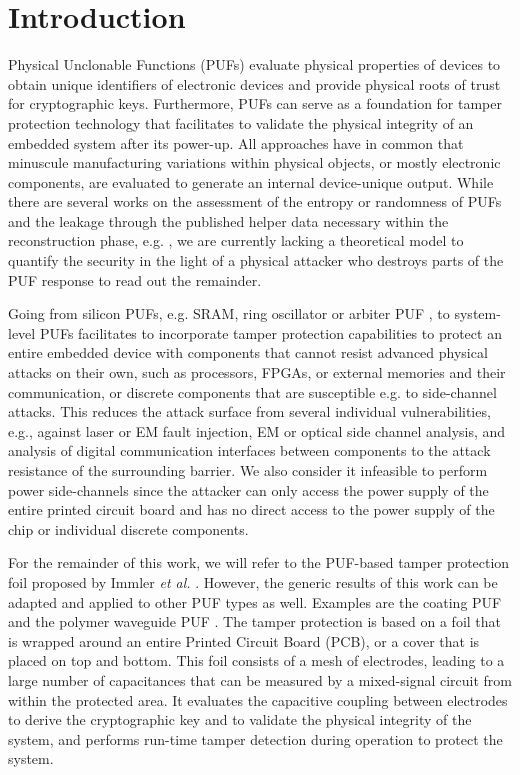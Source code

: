 \section{Introduction}

Physical Unclonable Functions (PUFs) evaluate physical properties of devices to obtain unique identifiers of electronic devices and provide physical roots of trust for cryptographic keys. Furthermore, PUFs can serve as a foundation for tamper protection technology that facilitates to validate the physical integrity of an embedded system after its power-up. All approaches have in common that minuscule manufacturing variations within physical objects, or mostly electronic components, are evaluated to generate an internal device-unique output. While there are several works on the assessment of the entropy or randomness of PUFs \cite{maiti2013systematic,wilde2018spatial,frisch2023practical} and the leakage through the published helper data necessary within the reconstruction phase, e.g. \cite{DGSV15,DGV+16}, we are currently lacking a theoretical model to quantify the security in the light of a physical attacker who destroys parts of the PUF response to read out the remainder.

Going from silicon PUFs, e.g. SRAM, ring oscillator or arbiter PUF \cite{HYKD14}, to system-level PUFs facilitates to incorporate tamper protection capabilities to protect an entire embedded device with components that cannot resist advanced physical attacks on their own, such as processors, FPGAs, or external memories and their communication, or discrete components that are susceptible e.g. to side-channel attacks. This reduces the attack surface from several individual vulnerabilities, e.g., against laser or EM fault injection, EM or optical side channel analysis, and analysis of digital communication interfaces between components to the attack resistance of the surrounding barrier. We also consider it infeasible to perform power side-channels since the attacker can only access the power supply of the entire printed circuit board and has no direct access to the power supply of the chip or individual discrete components.

For the remainder of this work, we will refer to the PUF-based tamper protection foil proposed by Immler \emph{et al.} \cite{IOK+18,ION+19}. However, the generic results of this work can be adapted and applied to other PUF types as well. Examples are the coating PUF \cite{tuyls2006read} and the polymer waveguide PUF \cite{vai2016secure,geis2017}. The tamper protection is based on a foil that is wrapped around an entire Printed Circuit Board (PCB), or a cover that is placed on top and bottom. This foil consists of a mesh of electrodes, leading to a large number of capacitances that can be measured by a mixed-signal circuit from within the protected area. It evaluates the capacitive coupling between electrodes to derive the cryptographic key and to validate the physical integrity of the system, and performs run-time tamper detection during operation to protect the system.

